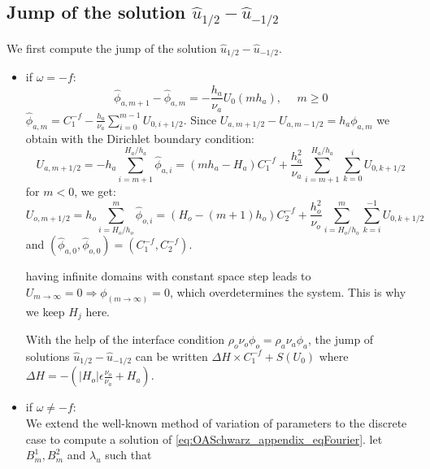 \subsection{Jump of the solution
	$\widehat{u}_{1/2} - \widehat{u}_{-1/2}$}
We first compute the jump of the solution
$\widehat{u}_{1/2} - \widehat{u}_{-1/2}$.
\begin{itemize}
\item if $\omega=-f$:
	\begin{equation}
		\widehat{\phi}_{a, m+1} - \widehat{\phi}_{a,m} =
		-\frac{h_a}{\nu_a} U_0(m h_a), ~~~~~~ m \geq 0
	\end{equation}
		$\widehat{\phi}_{a,m}= {C}_1^{-f} - \frac{h_a}{\nu_a}
	\sum_{i=0}^{m-1} U_{0, i+1/2}$.
	Since $U_{a, m+1/2}- U_{a, m-1/2} =
	h_a \phi_{a, m}$ we obtain with the Dirichlet
	boundary condition:
	\begin{equation}
		U_{a,m+1/2} = -h_a\sum_{i=m+1}^{H_a/h_a}
		\widehat{\phi}_{a,i} =(m h_a - H_a){C}_1^{-f}+
		\frac{h_a^2}{\nu_a}\sum_{i=m+1}^{H_a/h_a}
		\sum_{k=0}^{i}U_{0,k+1/2}
	\end{equation}
	for $m<0$, we get:
	\begin{equation}
		U_{o,m+1/2} = h_o\sum_{i=H_o/h_o}^{m}
		\widehat{\phi}_{o,i} =(H_o - (m+1) h_o){C}_2^{-f}+
		\frac{h_o^2}{\nu_o}\sum_{i=H_o/h_o}^{m}
		\sum_{k=i}^{-1}U_{0,k+1/2}
	\end{equation}
	and $(\widehat{\phi}_{a,0}, \widehat{\phi}_{o,0}) =
		({C}_1^{-f},{C}_2^{-f})$.
	\begin{remark}
		having infinite domains with constant space step
		leads to $U_{m\rightarrow \infty}=0 \Rightarrow
		\phi_{(m\rightarrow \infty)}=0$, which overdetermines
		the system. This is why we keep $H_j$ here.
	\end{remark}
	With the help of the interface condition
	$\rho_o \nu_o \phi_o = \rho_a \nu_a \phi_a$,
	the jump of solutions
	$\widehat{u}_{1/2} - \widehat{u}_{-1/2}$ can be written
		$ \Delta H \times {C}_1^{-f} +S(U_0)$ where
	$\Delta H = -(|H_o|\epsilon \frac{\nu_o}{\nu_a} + H_a)$.
\item if $\omega \neq -f$: \\
We extend the well-known method of variation of parameters to the
discrete case to compute a solution of
\eqref{eq:OASchwarz_appendix_eqFourier}.
	let $B_m^1, B_m^2$ and $\lambda_u$ such that

\end{itemize}
